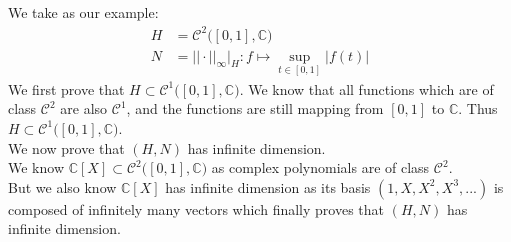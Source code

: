 \documentclass{article}
\begin{document}
\subsection{} %
We take as our example:
\begin{align*}
	H &= \mathcal{C}^2\big( [0,1] , \mathbb{C} \big)\\
	N &= ||\cdot || _{\infty} \big|_{H} : f \mapsto \sup_{t \in [0,1]} |f(t)|
\end{align*}
We first prove that $H \subset \mathcal{C}^1\big( [0,1] , \mathbb{C} \big)$. We know that all functions which are of class $\mathcal{C}^2$ are also $\mathcal{C}^1$, and the functions are still mapping from $[0,1]$ to $\mathbb{C}$. Thus $H \subset \mathcal{C}^1\big( [0,1] , \mathbb{C} \big)$.\\

\noindent We now prove that $(H, N)$ has infinite dimension. \\
We know $\mathbb{C}[X] \subset \mathcal{C}^2\big( [0,1] , \mathbb{C} \big)$ as complex polynomials are of class $\mathcal{C}^2$. \\
But we also know $\mathbb{C}[X]$ has infinite dimension as its basis $(1, X, X^2, X^3, ...)$ is composed of infinitely many vectors which finally proves that $(H, N)$ has infinite dimension. 
\end{document}
